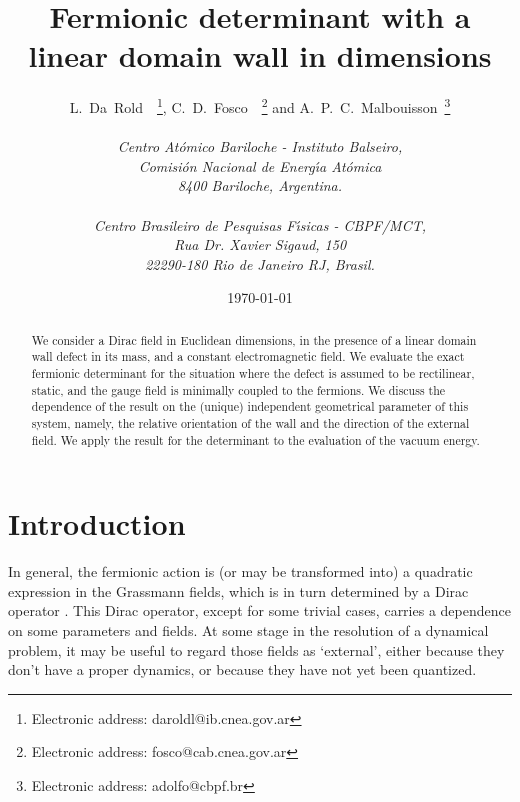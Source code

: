 \documentclass[a4paper,12pt]{article}
\begin{document}
\title{Fermionic determinant with a linear domain wall in \coordHE{}
  dimensions} 
\author{L.~Da~Rold~\coordHE{}~\footnote{Electronic address:
    daroldl@ib.cnea.gov.ar}, C.~D.~Fosco~\coordHE{}~\footnote{Electronic
    address: fosco@cab.cnea.gov.ar} and
  A.~P.~C.~Malbouisson\coordHE{}~\footnote{Electronic address:
    adolfo@cbpf.br}
  \\
  \\
  \normalsize{\it {}\coordHE{}Centro At\' omico Bariloche - Instituto
    Balseiro,}\\ \normalsize{\it Comisi{\'o}n Nacional de Energ\'{\i}a
    At{\'o}mica}\\ \normalsize{\it 8400 Bariloche, Argentina.}\\
  \\
  \normalsize{\it {}\coordHE{}Centro Brasileiro de Pesquisas F\'{{\i}}sicas - CBPF/MCT,}\\
  \normalsize{\it Rua Dr. Xavier Sigaud, 150}\\
  \normalsize{\it 22290-180 Rio de Janeiro RJ, Brasil.}}
\date{\today} \maketitle
\begin{abstract}
\noindent We consider a Dirac field in \coordHE{} Euclidean dimensions, 
in the presence of a linear domain wall defect in its mass, and a
constant electromagnetic field.  We evaluate the exact fermionic
determinant for the situation where the defect is assumed to be
rectilinear, static, and the gauge field is minimally coupled to the
fermions. We discuss the dependence of the result on the (unique)
independent geometrical parameter of this system, namely, the relative
orientation of the wall and the direction of the external field.  We
apply the result for the determinant to the evaluation of the vacuum
energy.
\end{abstract}
\newpage
\section{Introduction}
In general, the fermionic action \coordHE{} is (or may be transformed into) a
quadratic expression in the Grassmann fields, which is in turn
determined by a Dirac operator \coordHE{}. This Dirac operator,
except for some trivial cases, carries a dependence on some parameters
and fields. At some stage in the resolution of a dynamical problem, it
may be useful to regard those fields as `external', either because
they don't have a proper dynamics, or because they have not yet been
quantized.
\end{document}
